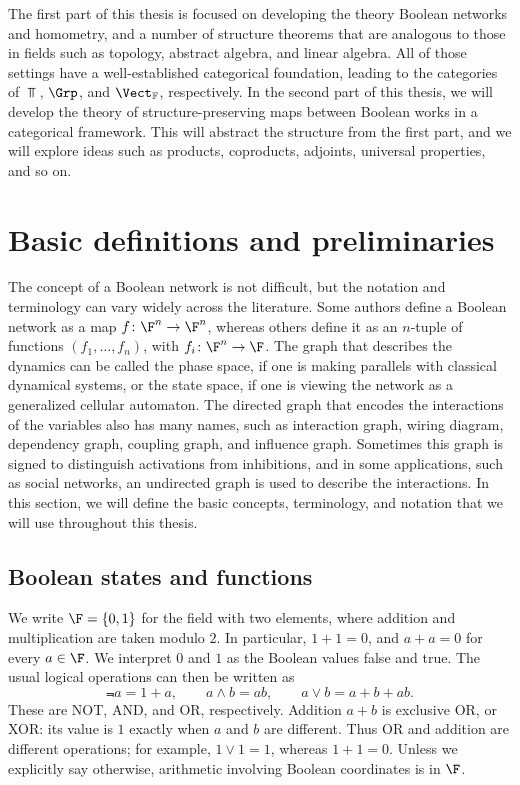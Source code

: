 The first part of this thesis is focused on developing the theory Boolean networks and homometry, and a number of structure theorems that are analogous to those in fields such as topology, abstract algebra, and linear algebra. All of those settings have a well-established categorical foundation, leading to the categories of $\Top$, $\Grp$, and $\Vect_{\mathbb{F}}$, respectively. In the second part of this thesis, we will develop the theory of structure-preserving maps between Boolean works in a categorical framework. This will abstract the structure from the first part, and we will explore ideas such as products, coproducts, adjoints, universal properties, and so on.


\section{Basic definitions and preliminaries}\label{sec:basic-preliminaries}


The concept of a Boolean network is not difficult, but the notation and terminology can vary widely across the literature. Some authors define a Boolean network as a map $f\colon\F^n\to\F^n$, whereas others define it as an $n$-tuple of functions $(f_1,\dots,f_n)$, with $f_i\colon\F^n\to\F$. The graph that describes the dynamics can be called the phase space, if one is making parallels with classical dynamical systems, or the state space, if one is viewing the network as a generalized cellular automaton. The directed graph that encodes the interactions of the variables also has many names, such as interaction graph, wiring diagram, dependency graph, coupling graph, and influence graph. Sometimes this graph is signed to distinguish activations from inhibitions, and in some applications, such as social networks, an undirected graph is used to describe the interactions. In this section, we will define the basic concepts, terminology, and notation that we will use throughout this thesis.

\subsection{Boolean states and functions}

We write $\F=\{0,1\}$ for the field with two elements, where addition and multiplication are taken modulo $2$. In particular, $1+1=0$, and $a+a=0$ for every $a\in\F$. We interpret $0$ and $1$ as the Boolean values false and true. The usual logical operations can then be written as
\[
    \Not{a}=1+a,\qquad
    a\wedge b=ab,\qquad
    a\vee b=a+b+ab.
\]
These are NOT, AND, and OR, respectively. Addition $a+b$ is exclusive OR, or XOR: its value is $1$ exactly when $a$ and $b$ are different. Thus OR and addition are different operations; for example, $1\vee1=1$, whereas $1+1=0$. Unless we explicitly say otherwise, arithmetic involving Boolean coordinates is in $\F$.

